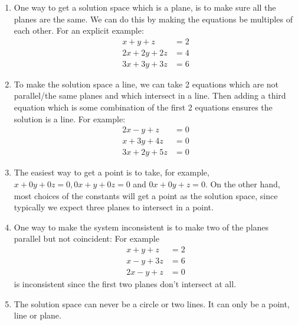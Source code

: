 \begin{SaveQuestion}
\begin{enumerate}
        \item One way to get a solution space which is a plane, is to make sure all the planes are the same. We can do this by making the equations be multiples of each other. For an explicit example:    
        $$\begin{aligned}  x +  y +  z &= 2\\
	 	2x + 2y + 2 z &= 4 \\
	 	3 x + 3 y + 3 z &= 6 \end{aligned}$$ 
        \item To make the solution space a line, we can take 2 equations which are not parallel/the same planes and which intersect in a line. Then adding a third equation which is some combination of the first 2 equations ensures the solution is a line. For example: 
	   $$\begin{aligned} 2x - y + z &= 0\\
	   x + 3y + 4 z &= 0 \\
	   3x + 2y + 5z &= 0
	   \end{aligned}$$
        \item The easiest way to get a point is to take, for example, $x + 0y + 0z = 0, 0x + y + 0z = 0 $ and $0x + 0 y + z = 0$. On the other hand, most choices of the constants will get a point as the solution space, since typically we expect three planes to intersect in a point. 
        \item One way to make the system inconsistent is to make two of the planes parallel but not coincident: For example
	 $$\begin{aligned}  x +  y +  z &= 2\\
	 x - y +  3 z &= 6 \\ 2x - y + z &= 0 \end{aligned}$$ 
	 is inconsistent since the first two planes don't intersect at all. 
        \item The solution space can never be a circle or two lines. It can only be a point, line or plane.
     \end{enumerate}
\end{SaveQuestion}




